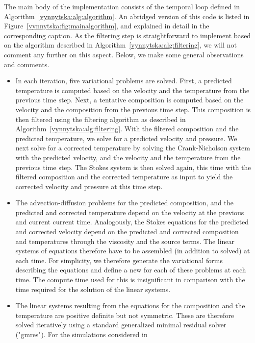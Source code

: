 The main body of the implementation consists of the temporal loop
defined in Algorithm~\ref{vynnytska:alg:algorithm}. An abridged
version of this code is listed in
Figure~\ref{vynnytska:fig:mainalgorithm}, and explained in detail in
the corresponding caption.  As the filtering step is straightforward
to implement based on the algorithm described in
Algorithm~\ref{vynnytska:alg:filtering}, we will not comment any
further on this aspect. Below, we make some general observations and
comments.
\begin{itemize}
\item
  In each iteration, five variational problems are solved. First, a
  predicted temperature is computed based on the velocity and the
  temperature from the previous time step. Next, a tentative
  composition is computed based on the velocity and the composition
  from the previous time step. This composition is then filtered using
  the filtering algorithm as described in
  Algorithm~\ref{vynnytska:alg:filtering}. With the filtered
  composition and the predicted temperature, we solve for a predicted
  velocity and pressure. We next solve for a corrected temperature by
  solving the Crank-Nicholson system with the predicted velocity, and
  the velocity and the temperature from the previous time step. The
  Stokes system is then solved again, this time with the filtered
  composition and the corrected temperature as input to yield the
  corrected velocity and pressure at this time step.
\item
  The advection-diffusion problems for the predicted composition, and
  the predicted and corrected temperature depend on the velocity at
  the previous and current current time. Analogously, the Stokes
  equations for the predicted and corrected velocity depend on the
  predicted and corrected composition and temperatures through the
  viscosity and the source terms. The linear systems of equations
  therefore have to be assembled (in addition to solved) at each
  time. For simplicity, we therefore generate the variational forms
  describing the equations and define a new 
  for each of these problems at each time. The compute time used for
  this is insignificant in comparison with the time required for the
  solution of the linear systems.
\item
  The linear systems resulting from the equations for the composition
  and the temperature are positive definite but not symmetric. These
  are therefore solved iteratively using a standard generalized
  minimal residual solver ("gmres"). For the simulations considered in

\end{itemize}
